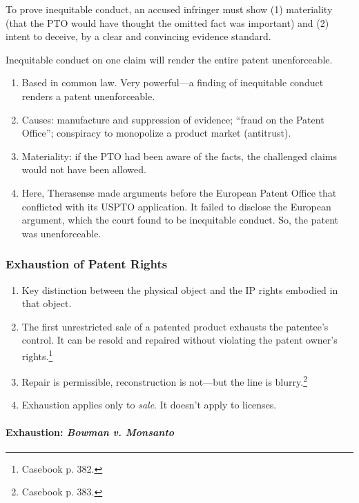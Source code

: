 To prove inequitable conduct, an accused infringer must show (1) materiality 
(that the PTO would have thought the omitted fact was important) and (2) 
intent to deceive, by a clear and convincing evidence standard.

Inequitable conduct on one claim will render the entire patent unenforceable.

\begin{enumerate}
    \item Based in common law. Very powerful---a finding of inequitable 
    conduct renders a patent unenforceable.
    \item Causes: manufacture and suppression of evidence; ``fraud on the 
    Patent Office''; conspiracy to monopolize a product market (antitrust).
    \item Materiality: if the PTO had been aware of the facts, the challenged 
    claims would not have been allowed.
    \item Here, Therasense made arguments before the European Patent Office 
    that conflicted with its USPTO application. It failed to disclose the 
    European argument, which the court found to be inequitable conduct. So, 
    the patent was unenforceable.
\end{enumerate}

\subsubsection{Exhaustion of Patent Rights} 

\begin{enumerate}
    \item Key distinction between the physical object and the IP rights 
    embodied in that object.
    \item The first unrestricted sale of a patented product exhausts the 
    patentee's control. It can be resold and repaired without violating the 
    patent owner's rights.\footnote{Casebook p. 382.}
    \item Repair is permissible, reconstruction is not---but the line is 
    blurry.\footnote{Casebook p. 383.}
    \item Exhaustion applies only to \emph{sale}. It doesn't apply to 
    licenses.
\end{enumerate}

\paragraph{Exhaustion: \emph{Bowman v. Monsanto}}

